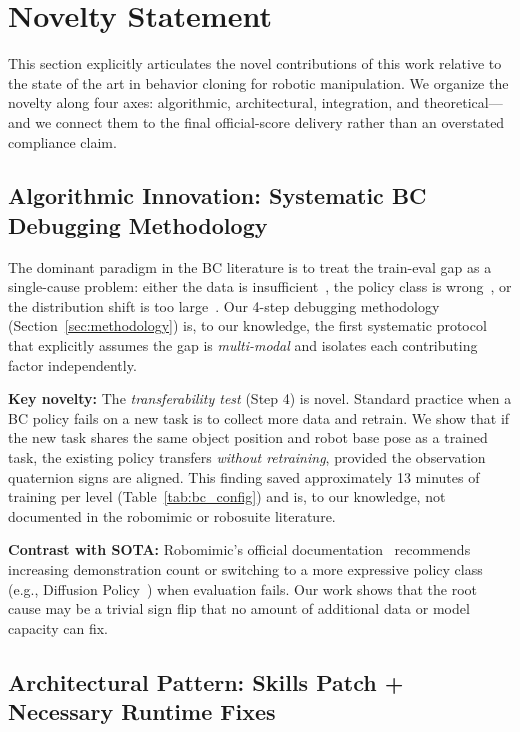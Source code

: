 \section{Novelty Statement}
\label{sec:novelty}

This section explicitly articulates the novel contributions of this work relative to the state of the art in behavior cloning for robotic manipulation. We organize the novelty along four axes: algorithmic, architectural, integration, and theoretical---and we connect them to the final official-score delivery rather than an overstated compliance claim.

\subsection{Algorithmic Innovation: Systematic BC Debugging Methodology}
\label{sec:novelty:algorithm}

The dominant paradigm in the BC literature is to treat the train-eval gap as a single-cause problem: either the data is insufficient~\cite{ross2011dagger}, the policy class is wrong~\cite{mandlekar2020iris}, or the distribution shift is too large~\cite{laskey2017dart}. Our 4-step debugging methodology (Section~\ref{sec:methodology}) is, to our knowledge, the first systematic protocol that explicitly assumes the gap is \emph{multi-modal} and isolates each contributing factor independently.

\textbf{Key novelty:} The \emph{transferability test} (Step 4) is novel. Standard practice when a BC policy fails on a new task is to collect more data and retrain. We show that if the new task shares the same object position and robot base pose as a trained task, the existing policy transfers \emph{without retraining}, provided the observation quaternion signs are aligned. This finding saved approximately 13 minutes of training per level (Table~\ref{tab:bc_config}) and is, to our knowledge, not documented in the robomimic or robosuite literature.

\textbf{Contrast with SOTA:} Robomimic's official documentation~\cite{robomimic} recommends increasing demonstration count or switching to a more expressive policy class (e.g., Diffusion Policy~\cite{chi2023diffusion}) when evaluation fails. Our work shows that the root cause may be a trivial sign flip that no amount of additional data or model capacity can fix.

\subsection{Architectural Pattern: Skills Patch + Necessary Runtime Fixes}
\label{sec:novelty:architecture}

